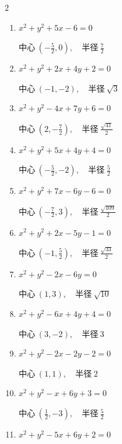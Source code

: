 \begin{multicols}{2}
\begin{enumerate}
        $\displaystyle 中心\: \left(\frac{5}{2},\frac{1}{2}\right), \quad 半径 \ \frac{\sqrt{14}}{2}$

\columnbreak %

  \item $x^{2}+y^{2}+5x-6=0$

        $\displaystyle 中心\: \left(-\frac{5}{2},0\right), \quad 半径 \ \frac{7}{2}$

  \item $x^{2}+y^{2}+2x+4y+2=0$

        $\displaystyle 中心\: \left(-1,-2\right), \quad 半径 \ \sqrt{3}$

  \item $x^{2}+y^{2}-4x+7y+6=0$

        $\displaystyle 中心\: \left(2,-\frac{7}{2}\right), \quad 半径 \ \frac{\sqrt{41}}{2}$

  \item $x^{2}+y^{2}+5x+4y+4=0$

        $\displaystyle 中心\: \left(-\frac{5}{2},-2\right), \quad 半径 \ \frac{5}{2}$

  \item $x^{2}+y^{2}+7x-6y-6=0$

        $\displaystyle 中心\: \left(-\frac{7}{2},3\right), \quad 半径 \ \frac{\sqrt{109}}{2}$

  \item $x^{2}+y^{2}+2x-5y-1=0$

        $\displaystyle 中心\: \left(-1,\frac{5}{2}\right), \quad 半径 \ \frac{\sqrt{33}}{2}$

  \item $x^{2}+y^{2}-2x-6y=0$

        $\displaystyle 中心\: \left(1,3\right), \quad 半径 \ \sqrt{10}$

  \item $x^{2}+y^{2}-6x+4y+4=0$

        $\displaystyle 中心\: \left(3,-2\right), \quad 半径 \ 3$

  \item $x^{2}+y^{2}-2x-2y-2=0$

        $\displaystyle 中心\: \left(1,1\right), \quad 半径 \ 2$

  \item $x^{2}+y^{2}-x+6y+3=0$

        $\displaystyle 中心\: \left(\frac{1}{2},-3\right), \quad 半径 \ \frac{5}{2}$

  \item $x^{2}+y^{2}-5x+6y+2=0$


\end{enumerate}
\end{multicols}

